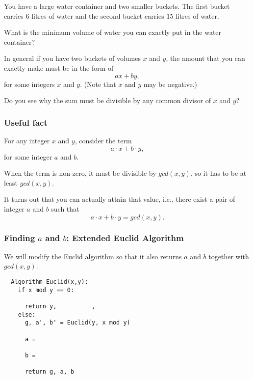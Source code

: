 \begin{frame}
  You have a large water container and two smaller buckets. The first
  bucket carries 6 litres of water and the second bucket carries 15
  litres of water.

  What is the minimum volume of water you can exactly put in the water
  container?

  \pause

  \vspace{0.2in}
  In general if you have two buckets of volumes $x$ and $y$, the amount
  that you can exactly make must be in the form of
  \[
  ax + by,
  \]
  for some integers $x$ and $y$.  (Note that $x$ and $y$ may be
  negative.)

  \pause Do you see why the sum must be divisible by any common
  divisor of $x$ and $y$?
\end{frame}

\begin{frame}
  \frametitle{Useful fact}

  For any integer $x$ and $y$, consider the term
  \[
  a\cdot x + b\cdot y,
  \]
  for some integer $a$ and $b$.

  \pause
  When the term is non-zero, it must be divisible by $gcd(x,y)$, so it
  has to be at least $gcd(x,y)$.

  \vspace{0.2in}

  It turns out that you can actually attain that value, i.e.,
  there exist a pair of integer $a$ and
  $b$ such that
  \[
  a\cdot x + b\cdot y = gcd(x,y).
  \]
\end{frame}

\begin{frame}[fragile]
  \frametitle{Finding $a$ and $b$: Extended Euclid Algorithm}

  We will modify the Euclid algorithm so that it also returns $a$ and
  $b$ together with $gcd(x,y)$.
  
  \begin{tcolorbox}
  {\small
\begin{verbatim}
  Algorithm Euclid(x,y):
    if x mod y == 0:

      return y,          ,
    else:
      g, a', b' = Euclid(y, x mod y)

      a =

      b =

      return g, a, b
\end{verbatim}
  }
  \end{tcolorbox}
  
\end{frame}

